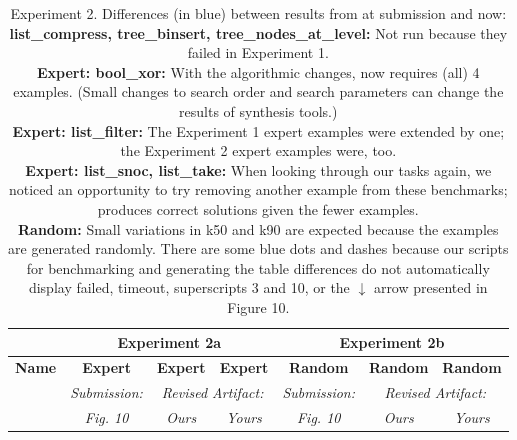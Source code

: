 \begin{table}

\experimentTableSize

\begin{tabular}{l|cccccc}
& \multicolumn{3}{c}{\textbf{Experiment 2a}}
& \multicolumn{3}{c}{\textbf{Experiment 2b}} \\\hline
\textbf{Name} &
\textbf{Expert} & \textbf{Expert} & \textbf{Expert} &
\textbf{Random} & \textbf{Random} & \textbf{Random} \\
&
\textit{Submission:} & \multicolumn{2}{c}{\textit{Revised Artifact:}} &
\textit{Submission:} & \multicolumn{2}{c}{\textit{Revised Artifact:}} \\
&
\textit{Fig. 10} & \textit{Ours} & \textit{Yours} &
\textit{Fig. 10} & \textit{Ours} & \textit{Yours} \\

\end{tabular}

\vspace{0.10in}

\caption{Experiment 2.
%
Differences (in blue) between results from \snsMyth{} at submission and
\snsMyth{} now:
%
\experimentCaptionSize
%
\\[3pt]
%
\textbf{list\_compress, tree\_binsert, tree\_nodes\_at\_level:} Not run because
they failed in Experiment 1.
%
\\[3pt]
%
\textbf{Expert: bool\_xor:} With the algorithmic changes, \snsMyth{} now
requires (all) 4 examples.  (Small changes to search order and search parameters
can change the results of synthesis tools.)
%
\\[3pt]
%
\textbf{Expert: list\_filter:} The Experiment 1 expert examples were extended by
one; the Experiment 2 expert examples were, too.
%
\\[3pt]
%
\textbf{Expert: list\_snoc, list\_take:} When looking through our tasks again,
we noticed an opportunity to try removing another example from these benchmarks;
\snsMyth{} produces correct solutions given the fewer examples.
%
\\[3pt]
%
\textbf{Random:} Small variations in k50 and k90 are expected because the
examples are generated randomly. There are some blue dots and dashes because our
scripts for benchmarking and generating the table differences do not
automatically display {\scriptsize{failed}}, {\scriptsize{timeout}},
superscripts 3 and 10, or the $\downarrow$ arrow presented in Figure 10.
%
\\[3pt]
%
}

\end{table}
